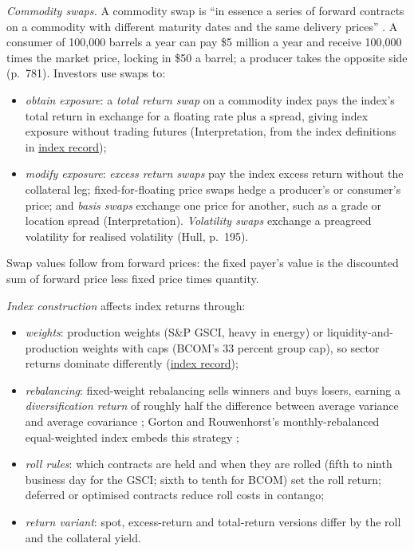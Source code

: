 \begin{qfmethod}\label{meth:commodity-swaps-index-construction}
 \emph{Commodity swaps.} A commodity swap is ``in essence a series of forward contracts on a commodity with different maturity dates and the same delivery prices'' \citep[p.~195]{s7-hulloptions}. A consumer of 100,000 barrels a year can pay \$5 million a year and receive 100,000 times the market price, locking in \$50 a barrel; a producer takes the opposite side (p.~781). Investors use swaps to:
\begin{itemize}
\item \emph{obtain exposure}: a \emph{total return swap} on a commodity index pays the index's total return in exchange for a floating rate plus a spread, giving index exposure without trading futures (Interpretation, from the index definitions in \hyperref[def:commodity-indices-risk-return]{index record});
\item \emph{modify exposure}: \emph{excess return swaps} pay the index excess return without the collateral leg; fixed-for-floating price swaps hedge a producer's or consumer's price; and \emph{basis swaps} exchange one price for another, such as a grade or location spread (Interpretation). \emph{Volatility swaps} exchange a preagreed volatility for realised volatility (Hull, p.~195).
\end{itemize}
Swap values follow from forward prices: the fixed payer's value is the discounted sum of forward price less fixed price times quantity.

\emph{Index construction} affects index returns through:
\begin{itemize}
\item \emph{weights}: production weights (S\&P GSCI, heavy in energy) or liquidity-and-production weights with caps (BCOM's 33 percent group cap), so sector returns dominate differently (\hyperref[def:commodity-indices-risk-return]{index record});
\item \emph{rebalancing}: fixed-weight rebalancing sells winners and buys losers, earning a \emph{diversification return} of roughly half the difference between average variance and average covariance \citep[pp.~24--25]{wide-erb-harvey-commodity}; Gorton and Rouwenhorst's monthly-rebalanced equal-weighted index embeds this strategy \citep[p.~9]{s16-r34};
\item \emph{roll rules}: which contracts are held and when they are rolled (fifth to ninth business day for the GSCI; sixth to tenth for BCOM) set the roll return; deferred or optimised contracts reduce roll costs in contango;
\item \emph{return variant}: spot, excess-return and total-return versions differ by the roll and the collateral yield.
\end{itemize}


\end{qfmethod}

